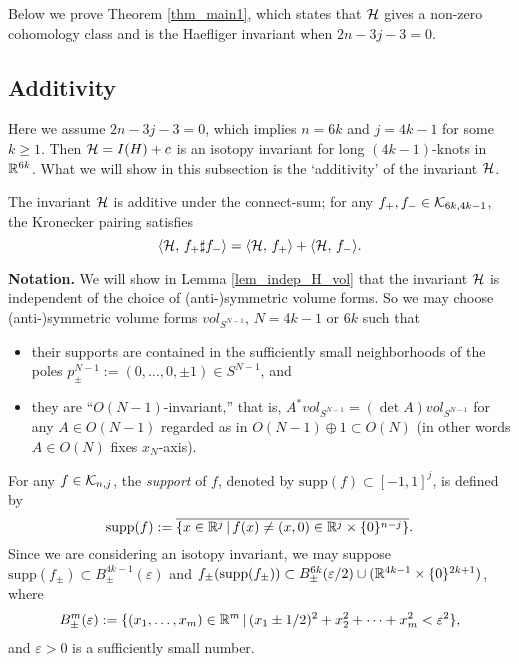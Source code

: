 Below we prove Theorem \ref{thm_main1}, which states that $\mathcal{H}$ gives a non-zero cohomology class and is the
Haefliger invariant when $2n-3j-3 = 0$.





\subsection{Additivity}\label{subsec_additive}


Here we assume $2n-3j-3=0$, which implies $n=6k$ and $j=4k-1$ for some $k \ge 1$.
Then $\mathcal{H} =I(H)+c$ is an isotopy invariant for long $(4k-1)$-knots in $\mathbb{R}^{6k}$.
What we will show in this subsection is the `additivity' of the invariant $\mathcal{H}$.


\begin{prop}\label{prop_additive}
The invariant $\mathcal{H}$ is additive under the connect-sum;
for any $f_+ ,f_- \in \mathcal{K}_{6k ,4k-1}$, the Kronecker pairing satisfies
\[
 \langle {\mathcal{H}},\, {f_+ \sharp f_-}\rangle = \langle {\mathcal{H}},\, {f_+}\rangle + \langle {\mathcal{H}},\, {f_-}\rangle.
\]
\end{prop}


\noindent
{\bf Notation.}
We will show in Lemma \ref{lem_indep_H_vol} that the invariant $\mathcal{H}$ is independent of the choice of (anti-)symmetric
volume forms.
So we may choose (anti-)symmetric volume forms $vol_{S^{N-1}}$, $N=4k-1$ or $6k$ such that
\begin{itemize}
\item
 their supports are contained in the sufficiently small neighborhoods of the poles
 $p^{N-1}_{\pm} := (0,\dots ,0,\pm 1) \in S^{N-1}$, and
\item
 they are ``$O(N-1)$-invariant,'' that is, $A^* vol_{S^{N-1}}=(\det A)vol_{S^{N-1}}$ for any $A\in O(N-1)$ regarded as
 in $O(N-1)\oplus 1 \subset O(N)$ (in other words $A\in O(N)$ fixes $x_N$-axis).
\end{itemize}

\smallskip

For any $f \in \mathcal{K}_{n ,j}$, the {\em support} of $f$, denoted by $\text{supp}(f) \subset [-1,1]^j$, is defined by
\[
 \text{supp}(f) := \overline{\{ x \in \mathbb{R}^j \, | \, f(x) \ne (x,0) \in \mathbb{R}^j \times \{ 0 \}^{n-j} \}} .
\]
Since we are considering an isotopy invariant, we may suppose
$\text{supp}(f_{\pm}) \subset B^{4k-1}_{\pm}(\varepsilon )$ and
$f_{\pm}(\text{supp}(f_{\pm})) \subset B^{6k}_{\pm}(\varepsilon /2) \cup (\mathbb{R}^{4k-1}\times \{ 0\}^{2k+1})$, where
\[
 B^m_{\pm} (\varepsilon ) := \{ (x_1 ,\dots ,x_m ) \in \mathbb{R}^m \, | \, ( x_1 \pm 1/2 )^2 +x^2_2 +\dots +x^2_m
 < \varepsilon^2 \} ,
\]
and $\varepsilon >0$ is a sufficiently small number.


